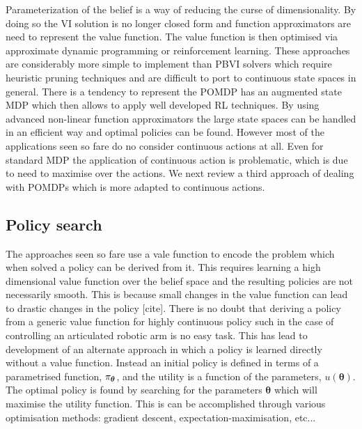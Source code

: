 Parameterization of the belief is a way of reducing the curse of dimensionality. By doing so the VI solution is no longer closed form and
function approximators are need to represent the value function. The value function is then optimised via approximate dynamic programming 
or reinforcement learning. These approaches are considerably more simple to implement than PBVI solvers which require heuristic pruning 
techniques and are difficult to port to continuous state spaces in general. There is a tendency to represent the POMDP has an augmented state MDP 
which then allows to apply well developed RL techniques. By using advanced non-linear function approximators the large state spaces can be 
handled in an efficient way and optimal policies can be found. However most of the applications seen so fare do no consider continuous actions
at all. Even for standard MDP the application of continuous action is problematic, which is due to need to maximise over the actions. We next
review a third approach of dealing with POMDPs which is more adapted to continuous actions. 

\subsection{Policy search}

The approaches seen so fare use a vale function to encode the problem which when solved a policy can be derived from it.
This requires learning a high dimensional value function over the belief space and the resulting policies are not necessarily 
smooth. This is because small changes in the value function can lead to drastic changes in the policy [cite]. There is no 
doubt that deriving a policy from a generic value function for highly continuous policy such in the case of controlling an
articulated robotic arm is no easy task. 
This has lead to development of an alternate approach in which a policy is learned directly without a value function. Instead
an initial policy is defined in terms of a parametrised function, $\operatorname{\pi_{\boldsymbol{\theta}}}$, and the utility is a function of the parameters, 
$u(\boldsymbol{\theta})$. The optimal policy is found by searching for the parameters $\boldsymbol{\theta}$ which will maximise 
the utility function. This is can be accomplished through various optimisation methods: gradient descent, expectation-maximisation, etc...


